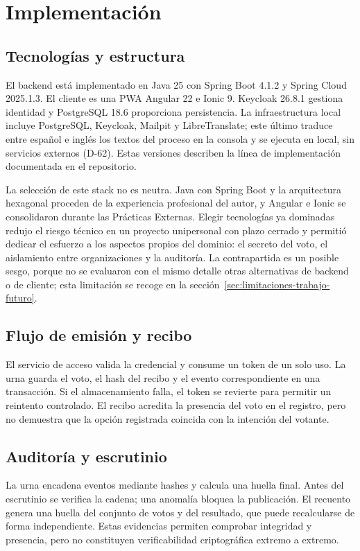 \chapter{Implementación}
\label{cap:implementacion}

\section{Tecnologías y estructura}
\label{sec:tecnologias-estructura}
El backend está implementado en Java 25 con Spring Boot 4.1.2 y Spring Cloud
2025.1.3. El cliente es una PWA Angular 22 e Ionic 9. Keycloak 26.8.1 gestiona
identidad y PostgreSQL 18.6 proporciona persistencia. La infraestructura local
incluye PostgreSQL, Keycloak, Mailpit y LibreTranslate; este último traduce
entre español e inglés los textos del proceso en la consola y se ejecuta en
local, sin servicios externos (D-62). Estas versiones describen la línea de
implementación documentada en el repositorio.

La selección de este stack no es neutra. Java con Spring Boot y la
arquitectura hexagonal proceden de la experiencia profesional del autor, y
Angular e Ionic se consolidaron durante las Prácticas Externas. Elegir
tecnologías ya dominadas redujo el riesgo técnico en un proyecto unipersonal
con plazo cerrado y permitió dedicar el esfuerzo a los aspectos propios del
dominio: el secreto del voto, el aislamiento entre organizaciones y la
auditoría. La contrapartida es un posible sesgo, porque no se evaluaron con el
mismo detalle otras alternativas de backend o de cliente; esta limitación se
recoge en la sección~\ref{sec:limitaciones-trabajo-futuro}.

\section{Flujo de emisión y recibo}
El servicio de acceso valida la credencial y consume un token de un solo uso.
La urna guarda el voto, el hash del recibo y el evento correspondiente en una
transacción. Si el almacenamiento falla, el token se revierte para permitir
un reintento controlado. El recibo acredita la presencia del voto en el
registro, pero no demuestra que la opción registrada coincida con la intención
del votante.

\section{Auditoría y escrutinio}
La urna encadena eventos mediante hashes y calcula una huella final. Antes del
escrutinio se verifica la cadena; una anomalía bloquea la publicación. El
recuento genera una huella del conjunto de votos y del resultado, que puede
recalcularse de forma independiente. Estas evidencias permiten comprobar
integridad y presencia, pero no constituyen verificabilidad criptográfica
extremo a extremo.

